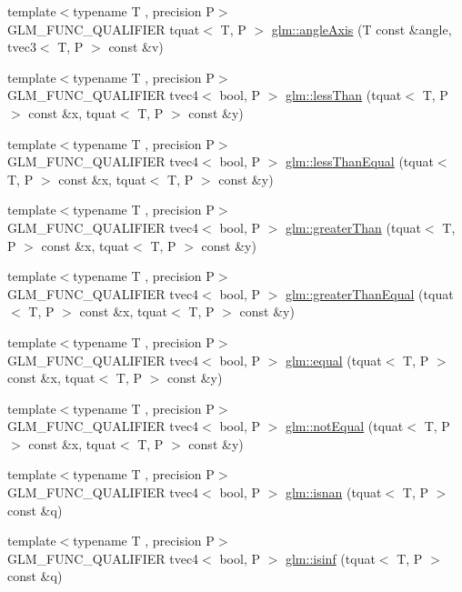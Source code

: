 \begin{DoxyCompactItemize}
\item 
{\footnotesize template$<$typename T , precision P$>$ }\\G\+L\+M\+\_\+\+F\+U\+N\+C\+\_\+\+Q\+U\+A\+L\+I\+F\+I\+ER tquat$<$ T, P $>$ \hyperlink{group__gtc__quaternion_ga37ae19405f1ccf766f27e4fcd035d859}{glm\+::angle\+Axis} (T const \&angle, tvec3$<$ T, P $>$ const \&v)
\item 
{\footnotesize template$<$typename T , precision P$>$ }\\G\+L\+M\+\_\+\+F\+U\+N\+C\+\_\+\+Q\+U\+A\+L\+I\+F\+I\+ER tvec4$<$ bool, P $>$ \hyperlink{group__gtc__quaternion_ga91a40d16a3b5bb47d71ac1a3fb688ffa}{glm\+::less\+Than} (tquat$<$ T, P $>$ const \&x, tquat$<$ T, P $>$ const \&y)
\item 
{\footnotesize template$<$typename T , precision P$>$ }\\G\+L\+M\+\_\+\+F\+U\+N\+C\+\_\+\+Q\+U\+A\+L\+I\+F\+I\+ER tvec4$<$ bool, P $>$ \hyperlink{group__gtc__quaternion_ga7c81996ed2724f26fe76faf352c76294}{glm\+::less\+Than\+Equal} (tquat$<$ T, P $>$ const \&x, tquat$<$ T, P $>$ const \&y)
\item 
{\footnotesize template$<$typename T , precision P$>$ }\\G\+L\+M\+\_\+\+F\+U\+N\+C\+\_\+\+Q\+U\+A\+L\+I\+F\+I\+ER tvec4$<$ bool, P $>$ \hyperlink{group__gtc__quaternion_ga09d21a588ae425ac7517ea65cc59a5ae}{glm\+::greater\+Than} (tquat$<$ T, P $>$ const \&x, tquat$<$ T, P $>$ const \&y)
\item 
{\footnotesize template$<$typename T , precision P$>$ }\\G\+L\+M\+\_\+\+F\+U\+N\+C\+\_\+\+Q\+U\+A\+L\+I\+F\+I\+ER tvec4$<$ bool, P $>$ \hyperlink{group__gtc__quaternion_ga0906a221a2037519fcf316ea5c1e3b3e}{glm\+::greater\+Than\+Equal} (tquat$<$ T, P $>$ const \&x, tquat$<$ T, P $>$ const \&y)
\item 
{\footnotesize template$<$typename T , precision P$>$ }\\G\+L\+M\+\_\+\+F\+U\+N\+C\+\_\+\+Q\+U\+A\+L\+I\+F\+I\+ER tvec4$<$ bool, P $>$ \hyperlink{group__gtc__quaternion_gac187115710365e0b2902220b9611e7b6}{glm\+::equal} (tquat$<$ T, P $>$ const \&x, tquat$<$ T, P $>$ const \&y)
\item 
{\footnotesize template$<$typename T , precision P$>$ }\\G\+L\+M\+\_\+\+F\+U\+N\+C\+\_\+\+Q\+U\+A\+L\+I\+F\+I\+ER tvec4$<$ bool, P $>$ \hyperlink{group__gtc__quaternion_ga484c4633f7c05d8e29ee8b452350f539}{glm\+::not\+Equal} (tquat$<$ T, P $>$ const \&x, tquat$<$ T, P $>$ const \&y)
\item 
{\footnotesize template$<$typename T , precision P$>$ }\\G\+L\+M\+\_\+\+F\+U\+N\+C\+\_\+\+Q\+U\+A\+L\+I\+F\+I\+ER tvec4$<$ bool, P $>$ \hyperlink{group__gtc__quaternion_gad2fc52dd4ba5ff79cc56b3e0f9c092ed}{glm\+::isnan} (tquat$<$ T, P $>$ const \&q)
\item 
{\footnotesize template$<$typename T , precision P$>$ }\\G\+L\+M\+\_\+\+F\+U\+N\+C\+\_\+\+Q\+U\+A\+L\+I\+F\+I\+ER tvec4$<$ bool, P $>$ \hyperlink{group__gtc__quaternion_ga0a850f06736d25887536d0da88e63c70}{glm\+::isinf} (tquat$<$ T, P $>$ const \&q)
\end{DoxyCompactItemize}


